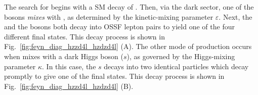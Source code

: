 The search for \PZD begins with a SM decay of \htozznostar.
Then, via the dark sector, one of the \PZ bosons \emph{mixes} with \PZD, as determined by the kinetic-mixing parameter $\varepsilon$.
Next, the \PZD and the \PZ bosons both decay into OSSF lepton pairs to yield one of the four different \fourl final states.
This decay process is shown in Fig.~\ref{fig:feyn_diag_hzzd4l_hzdzd4l} (A).
The other mode of \PZD production occurs when \PH mixes with a dark Higgs boson ($s$), as governed by the Higgs-mixing parameter $\kappa$.  %
In this case, the $s$ decays into two identical \PZD particles which decay promptly to give one of the \fourl final states.
This decay process is shown in Fig.~\ref{fig:feyn_diag_hzzd4l_hzdzd4l} (B).
